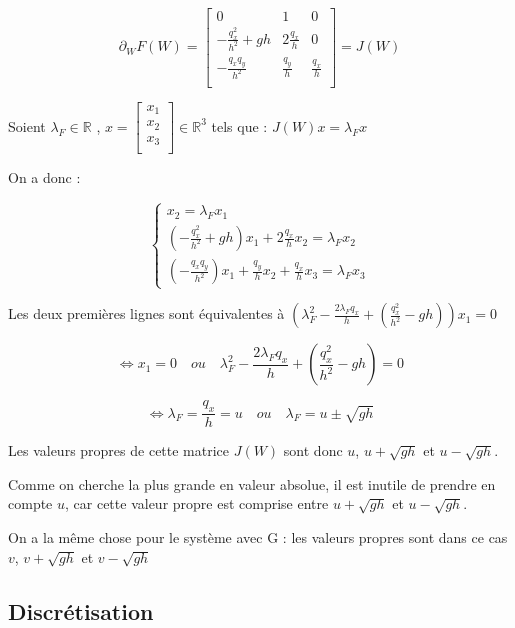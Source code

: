 \documentclass[
11pt, %
francais, %
singlespacing, %
headsepline, %
]{MastersDoctoralThesis} %
\theoremstyle{definition}
\begin{document}
\renewcommand{\arraystretch}{2}
$$ \partial_W F(W) = \begin{bmatrix} 
	0 & 1 & 0 \\
	-\frac{q_x^2}{h^2}+ gh & 2 \frac{q_x}{h} & 0\\
	-\frac{q_x q_y}{h^2} &  \frac{q_y}{h} & \frac{q_x}{h} \\
	\end{bmatrix} = J(W)
$$

Soient $\lambda _F \in \mathbb{R}$ , $ x = \left[ {\begin{array}{c}   x_1 \\    x_2 \\    x_3 \\  \end{array} } \right] \in \mathbb{R}^3$ tels que : $ J(W) x = \lambda _F x $

On a donc : 

$$\left\{
    \begin{array}{lll}
        x_2 = \lambda _F x_1 \\
        (-\frac{q_x^2}{h^2} + gh ) x_1 + 2 \frac{q_x}{h} x_2 = \lambda _F x_2  \\
        (-\frac{q_x q_y}{h^2} ) x_1 + \frac{q_y}{h} x_2 + \frac{q_x}{h} x_3 = \lambda _F x_3
    \end{array}
\right.
$$

Les deux premières lignes sont équivalentes à $ ( \lambda _F ^2 - \frac{2 \lambda _F q_x}{h} + (\frac{q_x^2}{h^2} - gh)) x_1 = 0$

$$ \Leftrightarrow x_1 = 0 \quad ou \quad \lambda _F ^2 - \frac{2 \lambda _F q_x}{h} + (\frac{q_x^2}{h^2} - gh ) = 0 $$

$$ \Leftrightarrow  \lambda _F = \frac{q_x}{h} = u \quad ou \quad \lambda _F = u \pm \sqrt{gh} $$

Les valeurs propres de cette matrice $J(W)$ sont donc $u$, $u + \sqrt{gh}$ et $u - \sqrt{gh}$.

Comme on cherche la plus grande en valeur absolue, il est inutile de prendre en compte $u$, car cette valeur propre est comprise entre $u + \sqrt{gh}$ et $u - \sqrt{gh}$.

On a la même chose pour le système avec G : les valeurs propres sont dans ce cas $v$, $v + \sqrt{gh}$ et $v - \sqrt{gh}$


\subsection{Discrétisation}
\end{document}
